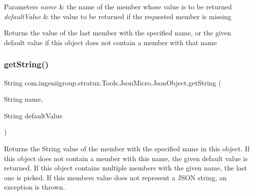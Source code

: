 \begin{DoxyParams}{Parameters}
{\em name} & the name of the member whose value is to be returned \\
\hline
{\em default\+Value} & the value to be returned if the requested member is missing \\
\hline
\end{DoxyParams}
\begin{DoxyReturn}{Returns}
the value of the last member with the specified name, or the given default value if this object does not contain a member with that name 
\end{DoxyReturn}
\mbox{\label{classcom_1_1ingeniigroup_1_1stratux_1_1_tools_1_1_json_micro_1_1_json_object_a745cd48b660af1115bf57c150b71d1bd}} 
\subsubsection{\texorpdfstring{get\+String()}{getString()}}
{\footnotesize\ttfamily String com.\+ingeniigroup.\+stratux.\+Tools.\+Json\+Micro.\+Json\+Object.\+get\+String (\begin{DoxyParamCaption}\item[{String}]{name,  }\item[{String}]{default\+Value }\end{DoxyParamCaption})}

Returns the {\ttfamily String} value of the member with the specified name in this object. If this object does not contain a member with this name, the given default value is returned. If this object contains multiple members with the given name, the last one is picked. If this member\textquotesingle{}s value does not represent a J\+S\+ON string, an exception is thrown.


